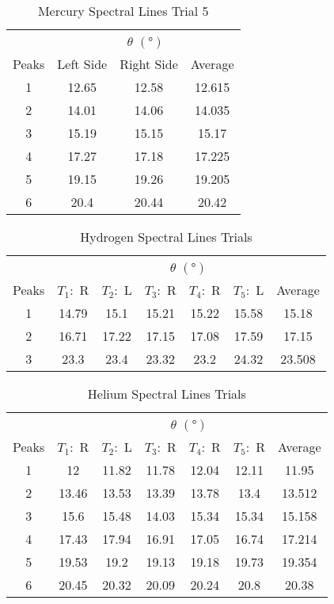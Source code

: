 \documentclass[12pt]{article}
\begin{document}
	\begin{table}[htbp]
		\centering
		\caption{Mercury Spectral Lines Trial 5}
		\begin{tabular}{cccc}
			\toprule
			& \multicolumn{3}{c}{$\theta$ $(\unit{\degree})$}  \\ \cmidrule{2-4}
			Peaks & Left Side & Right Side & Average \\
			\midrule
			1 & 12.65 & 12.58 & 12.615 \\
			2 & 14.01 & 14.06 & 14.035 \\
			3 & 15.19 & 15.15 & 15.17 \\
			4 & 17.27 & 17.18 & 17.225 \\
			5 & 19.15 & 19.26 & 19.205 \\
			6 & 20.4 & 20.44 & 20.42 \\
			\bottomrule
		\end{tabular}%
		\label{tab:MercurySpectralLinesTrial5}%
	\end{table}
	
	
	\begin{table}[htbp]
		\centering
		\caption{Hydrogen Spectral Lines Trials}
		\begin{tabular}{ccccccc}
			\toprule
			& \multicolumn{6}{c}{$\theta$ $(\unit{\degree})$} \\
			\cmidrule{2-7}    Peaks & $T_1:$ R & $T_2:$ L & $T_3:$ R & $T_4:$ R & $T_5:$ L & Average \\
			\midrule
			1 & 14.79 & 15.1 & 15.21 & 15.22 & 15.58 & 15.18 \\
			2 & 16.71 & 17.22 & 17.15 & 17.08 & 17.59 & 17.15 \\
			3 & 23.3 & 23.4 & 23.32 & 23.2 & 24.32 & 23.508 \\
			\bottomrule
		\end{tabular}
		\label{tab:HydrogenSpectralLinesTrials}
	\end{table}
	
	
	\begin{table}[htbp]
		\centering
		\caption{Helium Spectral Lines Trials}
		\begin{tabular}{ccccccc}
			\toprule
			& \multicolumn{6}{c}{$\theta$ $(\unit{\degree})$} \\
			\cmidrule{2-7}    Peaks & $T_1:$ R & $T_2:$ L & $T_3:$ R & $T_4:$ R & $T_5:$ R & Average \\
			\midrule
			1 & 12 & 11.82 & 11.78 & 12.04 & 12.11 & 11.95 \\
			2 & 13.46 & 13.53 & 13.39 & 13.78 & 13.4 & 13.512 \\
			3 & 15.6 & 15.48 & 14.03 & 15.34 & 15.34 & 15.158 \\
			4 & 17.43 & 17.94 & 16.91 & 17.05 & 16.74 & 17.214 \\
			5 & 19.53 & 19.2 & 19.13 & 19.18 & 19.73 & 19.354 \\
			6 & 20.45 & 20.32 & 20.09 & 20.24 & 20.8 & 20.38 \\
			\bottomrule
		\end{tabular}
		\label{tab:HeliumSpectralLinesTrials}
	\end{table}
	
\end{document}
